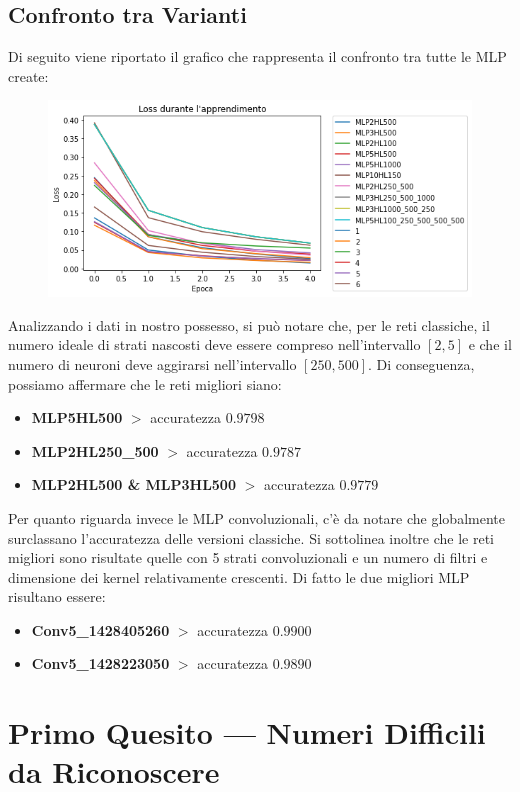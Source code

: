 \documentclass[12pt, a4paper]{article}
\begin{document}
\subsection{Confronto tra Varianti}
Di seguito viene riportato il grafico che rappresenta il confronto tra tutte le MLP create:
\begin{figure}[H]
    \centering
    \includegraphics[width=\textwidth]{ConfrontoTotale.png}
\end{figure}
Analizzando i dati in nostro possesso, si può notare che, per le reti classiche, il numero ideale di strati nascosti deve essere compreso nell'intervallo \([2, 5]\) e che il numero di neuroni deve aggirarsi nell'intervallo \([250 , 500]\).
Di conseguenza, possiamo affermare che le reti migliori siano:
\begin{itemize}
    \item \textbf{MLP5HL500} \(>\) accuratezza \(0.9798\)
    \item \textbf{MLP2HL250\_500} \(>\) accuratezza \(0.9787\)
    \item \textbf{MLP2HL500 \& MLP3HL500} \(>\) accuratezza \(0.9779\)
\end{itemize} 

Per quanto riguarda invece le MLP convoluzionali, c'è da notare che globalmente surclassano l'accuratezza delle versioni classiche. Si sottolinea inoltre che le reti migliori sono risultate quelle con 5 strati convoluzionali e un numero di filtri e dimensione dei kernel relativamente crescenti. Di fatto le due migliori MLP risultano essere:
\begin{itemize}
    \item \textbf{Conv5\_1428405260} \(>\) accuratezza \(0.9900\)
    \item \textbf{Conv5\_1428223050} \(>\) accuratezza \(0.9890\)
\end{itemize}

\newpage
\section{Primo Quesito --- Numeri Difficili da Riconoscere}
\end{document}
